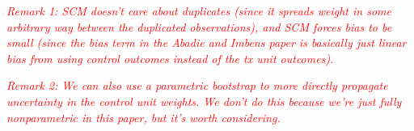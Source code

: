 \documentclass{article}
\newcommand{\note}[1]{\textcolor{red}{\textit{#1}}}
\begin{document}
\note{Remark 1: SCM doesn't care about duplicates (since it spreads weight in some arbitrary way between the duplicated observations), and SCM forces bias to be small (since the bias term in the Abadie and Imbens paper is basically just linear bias from using control outcomes instead of the tx unit outcomes).}

\note{Remark 2: We can also use a parametric bootstrap to more directly propagate uncertainty in the control unit weights. We don't do this because we're just fully nonparametric in this paper, but it's worth considering.}







\end{document}

